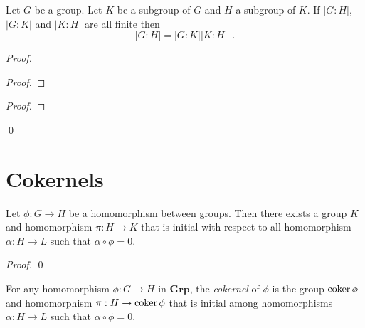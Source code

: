 \begin{prop}
Let $G$ be a group. Let $K$ be a subgroup of $G$ and $H$ a subgroup of $K$. If $|G:H|$, $|G:K|$ and $|K:H|$ are all finite then
\[ |G:H| = |G:K| |K:H| \enspace . \]
\end{prop}

\begin{proof}
\pf
{}
\begin{proof}
\end{proof}
\begin{proof}
\end{proof}
\qed
\end{proof}


\section{Cokernels}

\begin{prop}
Let $\phi : G \rightarrow H$ be a homomorphism between groups. Then there exists a group $K$ and homomorphism $\pi : H \rightarrow K$ that is initial with respect to all homomorphism $\alpha : H \rightarrow L$ such that $\alpha \circ \phi = 0$.
\end{prop}

\begin{proof}
\pf
{}
\qed
\end{proof}

\begin{df}[Cokernel]
For any homomorphism $\phi : G \rightarrow H$ in $\mathbf{Grp}$, the \emph{cokernel} of $\phi$ is the group $\operatorname{coker} \phi$ and homomorphism $\pi : H \rightarrow \operatorname{coker} \phi$ that is initial among homomorphisms $\alpha : H \rightarrow L$ such that $\alpha \circ \phi = 0$.
\end{df}

